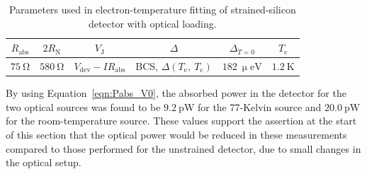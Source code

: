 \begin{table}[htb]
\caption[Parameters used in electron-temperature fitting of strained-silicon detector with optical loading]{Parameters used in electron-temperature fitting of strained-silicon detector with optical loading.} 
\label{tab:strainedTeParams_optical}
\centering
\begin{tabular}{cccccc}
\toprule\toprule
$R_{\mathrm{abs}}$ & $2R_{\mathrm{N}}$ & $V_{\mathrm{J}}$ & $\varDelta$ & $\varDelta_{T=0}$ & $T_{\mathrm{c}}$ \\ \midrule
$75~\mathrm{\Omega}$ & $580~\mathrm{\Omega}$ & $V_{\mathrm{dev}} - IR_{\mathrm{abs}}$ 
& BCS, $\varDelta\left(T_{\mathrm{e}},~T_{\mathrm{c}}\right)$ & $182~\mathrm{\upmu eV}$ & $1.2~\mathrm{K}$ \\
\bottomrule
\end{tabular}
\end{table}
\par 
By using Equation~\ref{eqn:Pabs_V0}, the absorbed power in the detector for the two optical sources was found to be $9.2~\mathrm{pW}$ for the 77-Kelvin source and $20.0~\mathrm{pW}$ for the room-temperature source. These values support the assertion at the start of this section that the optical power would be reduced in these measurements compared to those performed for the unstrained detector, due to small changes in the optical setup.
%
